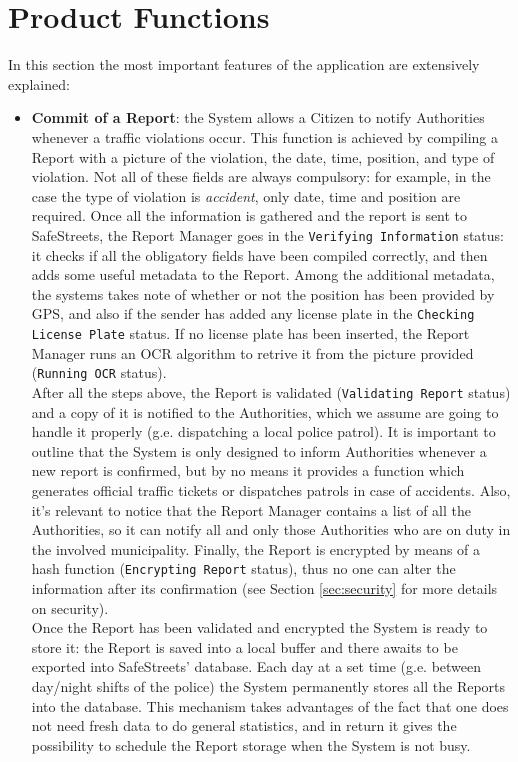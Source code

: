 \documentclass{report}
\begin{document}
\section{Product Functions}
In this section the most important features of the application are extensively explained:
\begin{itemize}
	\item \textbf{Commit of a Report}: the System allows a Citizen to notify Authorities whenever a traffic violations occur. This function is achieved by compiling a Report with a picture of the violation, the date, time, position, and type of violation. Not all of these fields are always compulsory: for example, in the case the type of violation is \textit{accident}, only date, time and position are required. Once all the information is gathered and the report is sent to SafeStreets, the Report Manager goes in the \texttt{Verifying Information} status: it checks if all the obligatory fields have been compiled correctly, and then adds some useful metadata to the Report. Among the additional metadata, the systems takes note of whether or not the position has been provided by GPS, and also if the sender has added any license plate in the \texttt{Checking License Plate} status. If no license plate has been inserted, the Report Manager runs an OCR algorithm to retrive it from the picture provided (\texttt{Running OCR} status). \\
	After all the steps above, the Report is validated (\texttt{Validating Report} status) and a copy of it is notified to the Authorities, which we assume are going to handle it properly (g.e. dispatching a local police patrol). It is important to outline that the System is only designed to inform Authorities whenever a new report is confirmed, but by no means it provides a function which generates official traffic tickets or dispatches patrols in case of accidents. Also, it's relevant to notice that the Report Manager contains a list of all the Authorities, so it can notify all and only those Authorities who are on duty in the involved municipality. Finally, the Report is encrypted by means of a hash function (\texttt{Encrypting Report} status), thus no one can alter the information after its confirmation (see Section \ref{sec:security} for more details on security). \\
	Once the Report has been validated and encrypted the System is ready to store it: the Report is saved into a local buffer and there awaits to be exported into SafeStreets' database. Each day at a set time (g.e. between day/night shifts of the police) the System permanently stores all the Reports into the database. This mechanism takes advantages of the fact that one does not need fresh data to do general statistics, and in return it gives the possibility to schedule the Report storage when the System is not busy.


\end{itemize}
\end{document}
